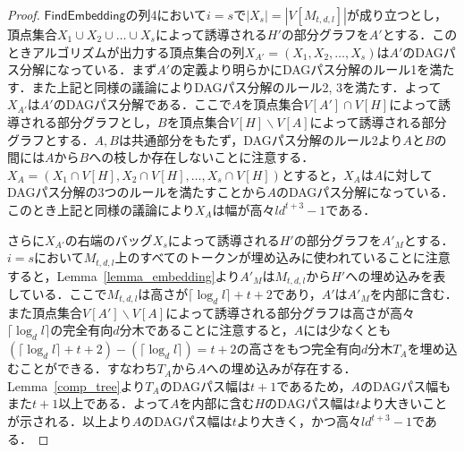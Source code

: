 \documentclass[master]{kuisthesis}		%
\theoremstyle{plain}
\theoremstyle{definition}
\begin{document}
\begin{proof}
    $\mathsf{FindEmbedding}$の列4において$i=s$で$|X_s| = |V[M_{t, d, l}]|$が成り立つとし，頂点集合$X_1 \cup X_2 \cup \dots \cup X_s$によって誘導される$H'$の部分グラフを$A'$とする．このときアルゴリズムが出力する頂点集合の列$X_{A'} = (X_1, X_2, \dots , X_s)$は$A'$のDAGパス分解になっている．まず$A'$の定義より明らかにDAGパス分解のルール1を満たす．また上記と同様の議論によりDAGパス分解のルール2, 3を満たす．よって$X_{A'}$は$A'$のDAGパス分解である．ここで$A$を頂点集合$V[A'] \cap V[H]$によって誘導される部分グラフとし，$B$を頂点集合$V[H] \backslash V[A]$によって誘導される部分グラフとする．$A, B$は共通部分をもたず，DAGパス分解のルール2より$A$と$B$の間には$A$から$B$への枝しか存在しないことに注意する．$X_A = (X_1 \cap V[H], X_2 \cap V[H], \dots , X_s \cap V[H])$とすると，$X_A$は$A$に対してDAGパス分解の3つのルールを満たすことから$A$のDAGパス分解になっている．このとき上記と同様の議論により$X_A$は幅が高々$ld^{t+3}-1$である．

    さらに$X_{A'}$の右端のバッグ$X_s$によって誘導される$H'$の部分グラフを$A'_M$とする．$i=s$において$M_{t, d, l}$上のすべてのトークンが埋め込みに使われていることに注意すると，Lemma~\ref{lemma_embedding}より$A'_M$は$M_{t, d, l}$から$H'$への埋め込みを表している．ここで$M_{t, d, l}$は高さが$\lceil \log_d l \rceil +t+2$であり，$A'$は$A'_M$を内部に含む．また頂点集合$V[A'] \backslash V[A]$によって誘導される部分グラフは高さが高々$\lceil \log_d l \rceil$の完全有向$d$分木であることに注意すると，$A$には少なくとも$(\lceil \log_d l \rceil +t+2) -(\lceil \log_d l \rceil) = t+2$の高さをもつ完全有向$d$分木$T_A$を埋め込むことができる．すなわち$T_A$から$A$への埋め込みが存在する．Lemma~\ref{comp_tree}より$T_A$のDAGパス幅は$t+1$であるため，$A$のDAGパス幅もまた$t+1$以上である．よって$A$を内部に含む$H$のDAGパス幅は$t$より大きいことが示される．以上より$A$のDAGパス幅は$t$より大きく，かつ高々$ld^{t+3}-1$である．


\end{proof}
\end{document}
